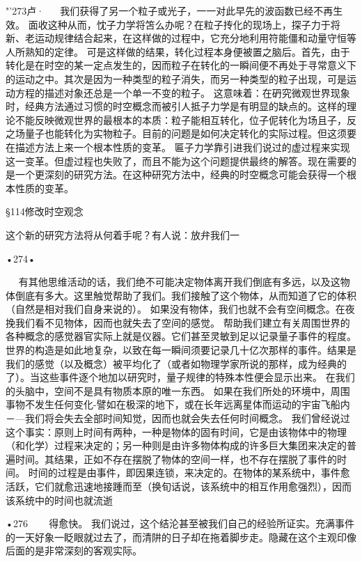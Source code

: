 "'273卢·
  
我们获得了另一个粒子或光子，一一对此早先的波函数已经不再生效。
面收这种从而，忱子力学将笘么办呢？在粒子抟化的现场上，探子力于将新、老运动规律结合起来，在这样做的过程中，它充分地利用符能僵和动量守恒等人所熟知的定律。
可是这样做的结果，转化过程本身便被置之脑后。首先，由于转化是在时空的某一定点发生的，因而粒子在转化的一瞬间便不再处于寻常意义下的运动之中。其次是因为一种类型的粒子消失，而另一种类型的粒子出现，可是运动方程的描述对象还总是一个单一不变的粒子。
这意味着：在砃究微观世界现象时，经典方法通过习惯的时空概念而被引人抵子力学是有明显的缺点的。这样的理论不能反映微观世界的最根本的本质：粒子能相互转化，位子伲转化为场且子，反之场量子也能转化为实物粒子。目前的问题是如何决定转化的实际过程。但这须要在描述方法上来一个根本性质的变革。
匾子力学靠引进我们说过的虚过程来实现这一变革。但虚过程也失败了，而且不能为这个问题提供最终的解答。现在需要的是一个更深刻的研究方法。在这种研究方法中，经典的时空概念可能会获得一个根本性质的变革。

§114修改时空观念

这个新的研究方法将从何着手呢？有人说：放弁我们一

•274•
  




  
有其他思维活动的话，我们绝不可能决定物体离开我们倒底有多远，以及这物体倒底有多大。这里触觉帮助了我们。我们接触了这个物体，从而知道了它的体积（自然是相对我们自身来说的）。
如果没有物体，我们也就不会有空间概念。在夜挽我们看不见物体，因而也就失去了空间的感觉。
帮助我们建立有关周围世界的各种概念的感觉器官实际上就是仪器。它们甚至灵敏到足以记录量子事件的程度。世界的构造是如此地复杂，以致在每一瞬间须要记录几十亿次那样的事件。结果是我们的感觉（以及概念）被平均化了（或者如物理学家所说的那样，成为经典的了）。当这些事件逐个地加以研究时，量子规律的特殊本性便会显示出来。
在我们的头脑中，空间不是具有物质本原的唯一东西。
如果在我们所处的环境中，周围事物不发生任何变化-譬如在极深的地下，或在长年远离星体而运动的宇宙飞船内－—我们将会失去全部时间知觉，因而也就会失去任何时间概念。
我们曾经说过这个事实：原则上时间有两种，一种是物体的固有时间，它是由该物体中的物理（和化学）过程来决定的；另一种则是由许多物体构成的许多巨大集团来决定的普遍时间。其结果，正如不存在摆脱了物体的空间一样，也不存在摆脱了事件的时间。
时间的过程是由事件，即因果连锁，来决定的。在物体的某系统中，事件愈活跃，它们就愈迅速地接踵而至（换旬话说，该系统中的相互作用愈强烈），因而该系统中的时间也就流逝

•276~
  
得愈快。
我们说过，这个结沦甚至被我们自己的经验所证实。充满事件的一天好象一眨眼就过去了，而清阱的日子却在拖着脚步走。隐藏在这个主观印像后面的是非常深刻的客观实际。

